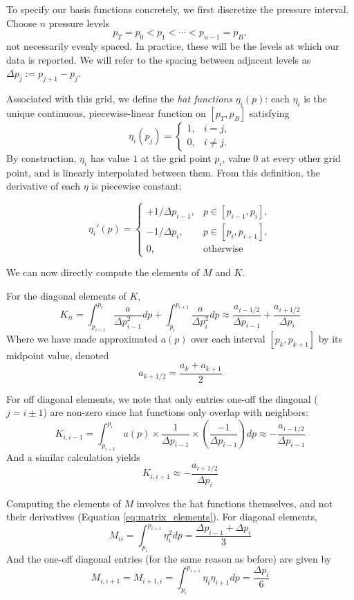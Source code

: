 \documentclass{article}
\numberwithin{equation}{section}
\begin{document}
To specify our basis functions concretely, we first discretize the
pressure interval. Choose $n$ pressure levels
\[
  p_T = p_0 < p_1 < \cdots < p_{n-1} = p_B,
\]
not necessarily evenly spaced. In practice, these will be the levels at
which our data is reported. We will refer to the spacing between adjacent
levels as $\Delta p_j := p_{j+1} - p_j$.

Associated with this grid, we define the \emph{hat functions} $\eta_i(p)$:
each $\eta_i$ is the unique continuous, piecewise-linear function on
$[p_T, p_B]$ satisfying
\[
  \eta_i(p_j) =
  \begin{cases}
    1, & i = j,\\
    0, & i \neq j.
  \end{cases}
\]
By construction, $\eta_i$ has value $1$ at the grid point $p_i$, value $0$ at every other grid point, and is linearly interpolated between them.  From this definition, the derivative of each $\eta$ is piecewise constant:

\[
  \eta_i'(p) =
  \begin{cases}
    +1/\Delta p_{i-1}, & p\in[p_{i-1}, p_i] ,\\
    -1/\Delta p_{i}, & p\in[p_{i}, p_{i+1}] ,\\
    0, & \text{otherwise}
  \end{cases}
\]

We can now directly compute the elements of $M$ and $K$. 

For the diagonal elements of $K$, 
\begin{equation}
  K_{ii}=\int_{p_{i-1}}^{p_i}\frac{a}{\Delta p_{i-1}^2}dp + \int_{p_{i}}^{p_{i+1}}\frac{a}{\Delta p_{i}^2}dp \approx \frac{a_{i-1/2}}{\Delta p_{i-1}} + \frac{a_{i+1/2}}{\Delta p_i}
\end{equation}
Where we have made approximated $a(p)$ over each interval $[p_k, p_{k+1}]$ by its midpoint value, denoted
$$
a_{k+1/2}=\frac{a_k+a_{k+1}}{2}
$$

For off diagonal elements, we note that only entries one-off the diagonal ($j=i\pm1$) are non-zero since hat functions only overlap with neighbors:
\begin{equation}
  K_{i, i-1}=\int_{p_{i-1}}^{p_i}a(p)\times\frac{1}{\Delta p_{i-1}}\times\left(\frac{-1}{\Delta p_{i-1}}\right)dp \approx -\frac{a_{i-1/2}}{\Delta p_{i-1}}
\end{equation}
And a similar calculation yields 
\begin{equation}
K_{i, i+1} \approx -\frac{a_{i+1/2}}{\Delta p_{i}}
\end{equation}

Computing the elements of $M$ involves the hat functions themselves, and not their derivatives (Equation \ref{eq:matrix_elements}). For diagonal elements, 
\begin{equation}
  M_{ii}=\int_{p_{i}}^{p_{i+1}}\eta_i^2dp = \frac{\Delta p_{i-1}+\Delta p_i}{3}
\end{equation}
And the one-off diagonal entries (for the same reason as before) are given by
\begin{equation}
  M_{i, i+1}=M_{i+1, i}=\int_{p_{i}}^{p_{i+1}}\eta_i\eta_{i+1}dp = \frac{\Delta p_i}{6}
\end{equation}
\end{document}
